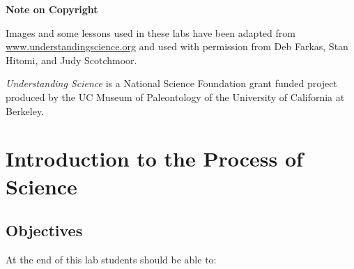 \documentclass[
]{book}
\begin{document}
\textbf{Note on Copyright}

Images and some lessons used in these labs have been adapted from \href{http://www.understandingscience.org/}{www.understandingscience.org} and used with permission from Deb Farkas, Stan Hitomi, and Judy Scotchmoor.

\emph{Understanding Science} is a National Science Foundation grant funded project produced by the UC Museum of Paleontology of the University of California at Berkeley.

\hypertarget{introduction-to-the-process-of-science}{%
\section*{Introduction to the Process of Science}\label{introduction-to-the-process-of-science}}

\hypertarget{objectives}{%
\subsection*{Objectives}\label{objectives}}

At the end of this lab students should be able to:
\end{document}
